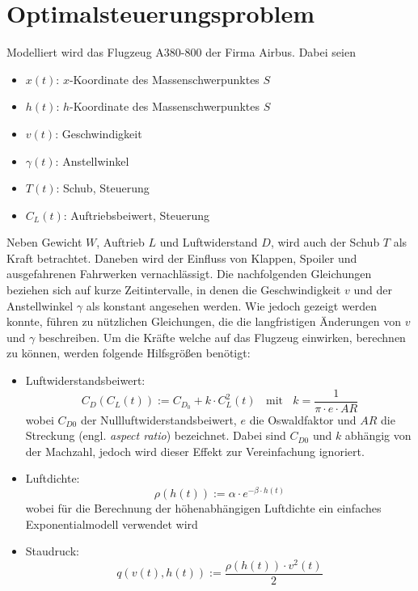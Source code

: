 \chapter{Optimalsteuerungsproblem} \label{cha:optim}

Modelliert wird das Flugzeug A380-800 der Firma Airbus. Dabei seien
\begin{itemize}
    \item $x(t)$: $x$-Koordinate des Massenschwerpunktes $S$
    \item $h(t)$: $h$-Koordinate des Massenschwerpunktes $S$
    \item $v(t)$: Geschwindigkeit
    \item $\gamma(t)$: Anstellwinkel
    \item $T(t)$: Schub, Steuerung
    \item $C_L(t)$: Auftriebsbeiwert, Steuerung
\end{itemize}
Neben Gewicht \(W\), Auftrieb \(L\) und Luftwiderstand \(D\), wird auch der Schub \(T\) als Kraft betrachtet. Daneben wird der Einfluss von Klappen, Spoiler und ausgefahrenen Fahrwerken vernachlässigt. Die nachfolgenden Gleichungen beziehen sich auf kurze Zeitintervalle, in denen die Geschwindigkeit $v$ und der Anstellwinkel $\gamma$ als konstant angesehen werden. Wie jedoch gezeigt werden konnte, führen zu nützlichen Gleichungen, die die langfristigen Änderungen von $v$ und $\gamma$ beschreiben. Um die Kräfte welche auf das Flugzeug einwirken, berechnen zu können, werden folgende Hilfsgrößen benötigt:
\begin{itemize}
    \item Luftwiderstandsbeiwert: \[C_D(C_L(t)) := C_{D_0} + k \cdot C^2_L(t) \ \ \ \ \text{mit} \ \ \ \ k = \dfrac{1}{\pi \cdot e \cdot AR}\] wobei $C_{D0}$ der Nullluftwiderstandsbeiwert, $e$ die Oswaldfaktor und $AR$ die Streckung (engl. \textit{aspect ratio}) bezeichnet. Dabei sind $C_{D0}$ und $k$ abhängig von der Machzahl, jedoch wird dieser Effekt zur Vereinfachung ignoriert. 
    
    \item Luftdichte: \[\rho(h(t)) := \alpha \cdot e^{-\beta \cdot h(t)}\]  wobei für die Berechnung der höhenabhängigen Luftdichte ein einfaches Exponentialmodell verwendet wird%

    \item Staudruck: \[q(v(t), h(t)) := \dfrac{\rho(h(t)) \cdot v^2(t)}{2} \]
\end{itemize}


